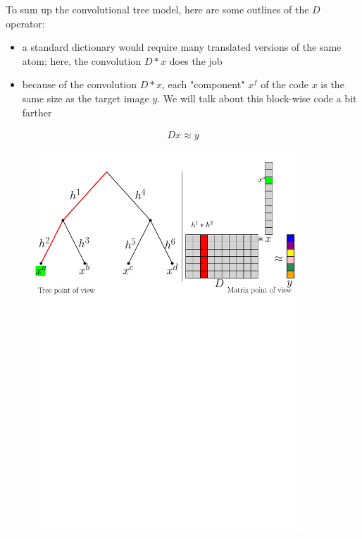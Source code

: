 To sum up the convolutional tree model, here are some outlines of the $D$ operator:
\begin{itemize}
\item a standard dictionary would require many translated versions of the same atom; here, the convolution $D*x$ does the job 
\item because of the convolution $D*x$, each "component" $x^f$ of the code $x$ is the same size as the target image $y$. We will talk about this block-wise code a bit farther
\end{itemize}


\begin{equation*} \begin{aligned}
Dx \approx y
\end{aligned} \end{equation*}


\begin{figure} \centering
\includegraphics[width=0.9\textwidth]{figures/matrix-vs-tree.pdf} \label{matrix_vs_tree}
\end{figure}


